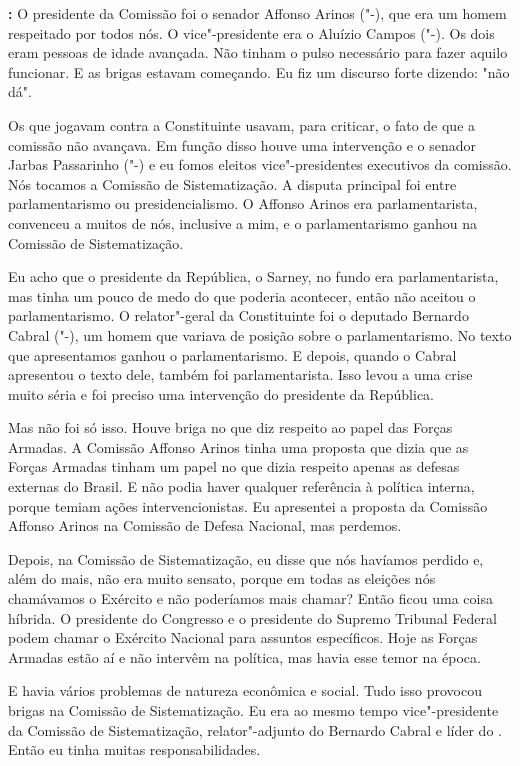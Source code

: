 \textbf{:} O presidente da Comissão foi o senador Affonso Arinos
("-), que era um homem respeitado por todos nós. O vice"-presidente
era o Aluízio Campos ("-). Os dois eram pessoas de idade avançada.
Não tinham o pulso necessário para fazer aquilo funcionar. E as brigas
estavam começando. Eu fiz um discurso forte dizendo: "não dá".

Os que jogavam contra a Constituinte usavam, para criticar, o fato de
que a comissão não avançava. Em função disso houve uma intervenção e o
senador Jarbas Passarinho ("-) e eu fomos eleitos vice"-presidentes
executivos da comissão. Nós tocamos a Comissão de Sistematização. A
disputa principal foi entre parlamentarismo ou presidencialismo. O
Affonso Arinos era parlamentarista, convenceu a muitos de nós, inclusive
a mim, e o parlamentarismo ganhou na Comissão de Sistematização.

Eu acho que o presidente da República, o Sarney, no fundo era
parlamentarista, mas tinha um pouco de medo do que poderia acontecer,
então não aceitou o parlamentarismo. O relator"-geral da Constituinte foi
o deputado Bernardo Cabral ("-), um homem que variava de posição
sobre o parlamentarismo. No texto que apresentamos ganhou o
parlamentarismo. E depois, quando o Cabral apresentou o texto dele,
também foi parlamentarista. Isso levou a uma crise muito séria e foi
preciso uma intervenção do presidente da República.

Mas não foi só isso. Houve briga no que diz respeito ao papel das Forças
Armadas. A Comissão Affonso Arinos tinha uma proposta que dizia que as
Forças Armadas tinham um papel no que dizia respeito apenas as defesas
externas do Brasil. E não podia haver qualquer referência à política
interna, porque temiam ações intervencionistas. Eu apresentei a proposta
da Comissão Affonso Arinos na Comissão de Defesa Nacional, mas perdemos.

Depois, na Comissão de Sistematização, eu disse que nós havíamos perdido
e, além do mais, não era muito sensato, porque em todas as eleições nós
chamávamos o Exército e não poderíamos mais chamar? Então ficou uma
coisa híbrida. O presidente do Congresso e o presidente do Supremo
Tribunal Federal podem chamar o Exército Nacional para assuntos
específicos. Hoje as Forças Armadas estão aí e não intervêm na política,
mas havia esse temor na época.

E havia vários problemas de natureza econômica e social. Tudo isso
provocou brigas na Comissão de Sistematização. Eu era ao mesmo tempo
vice"-presidente da Comissão de Sistematização, relator"-adjunto do
Bernardo Cabral e líder do . Então eu tinha muitas
responsabilidades.

